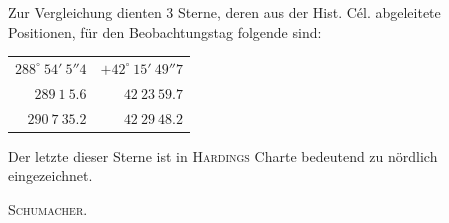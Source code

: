 Zur Vergleichung dienten 3 Sterne, deren aus der Hist. Cél. abgeleitete Positionen, für den Beobachtungstag folgende sind:

\begin{center}
\begin{tabular}{rr}
$288^\circ\ 54'\ 5''4$ & $+42^\circ\ 15'\ 49''7$ \\
$289\ 1\ 5.6$ & $42\ 23\ 59.7$ \\
$290\ 7\ 35.2$ & $42\ 29\ 48.2$ \\
\end{tabular}
\end{center}

Der letzte dieser Sterne ist in \textsc{Hardings} Charte bedeutend zu nördlich eingezeichnet.
\begin{flushright}\textsc{Schumacher}.\end{flushright}
